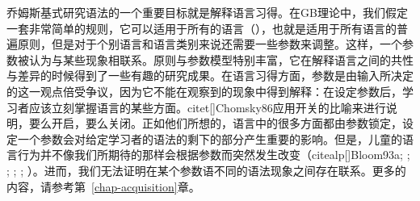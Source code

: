 乔姆斯基式研究语法的一个重要目标就是解释语言习得。在GB理论中，我们假定一套非常简单的规则，它可以适用于所有的语言（\xbart），也就是适用于所有语言的普遍原则，但是对于个别语言和语言类别来说还需要一些参数来调整。这样，一个参数被认为与某些现象相联系。原则与参数模型特别丰富，它在解释语言之间的共性与差异的时候得到了一些有趣的研究成果。在语言习得方面，参数是由输入所决定的这一观点倍受争议，因为它不能在观察到的现象中得到解释：在设定参数后，学习者应该立刻掌握语言的某些方面。citet[]{Chomsky86}应用开关的比喻来进行说明，要么开启，要么关闭。正如他们所想的，语言中的很多方面都由参数锁定，设定一个参数会对给定学习者的语法的剩下的部分产生重要的影响。但是，儿童的语言行为并不像我们所期待的那样会根据参数而突然发生改变（citealp[]{Bloom93a}; \citealp[]{Haider93a}; \citealp[]{Abney96a};
\citealp[Section~9.1]{AW98a}; \citealp{Tomasello2000a,Tomasello2003a};
\citealp{Newmeyer2005a}）。进而，我们无法证明在某个参数语不同的语法现象之间存在联系。更多的内容，请参考第~\ref{chap-acquisition}章。

